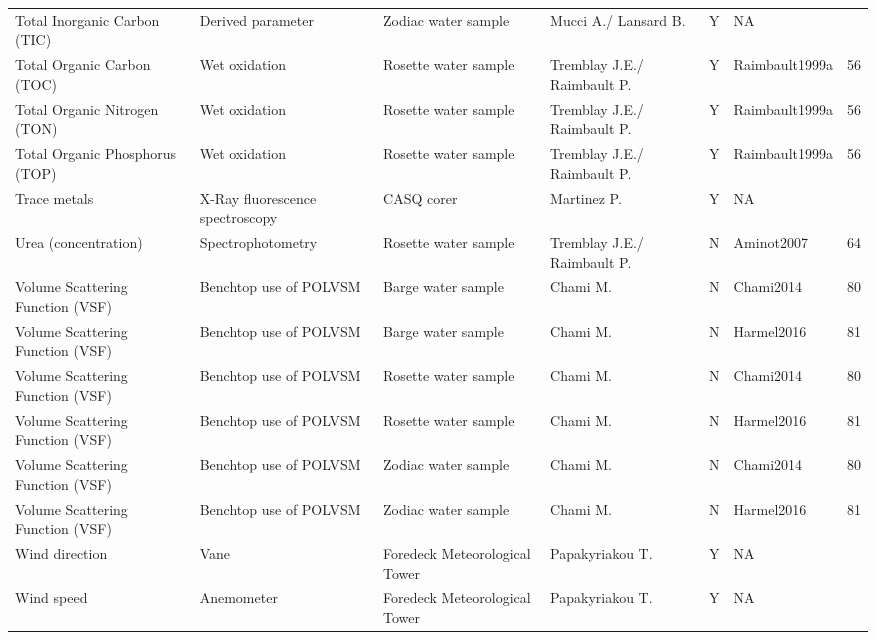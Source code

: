 \begin{ThreePartTable}
\begin{longtable}[t]{lllllll}
Total Inorganic Carbon (TIC) & Derived parameter & Zodiac water sample & Mucci A./ Lansard B. & Y & NA & \\
Total Organic Carbon (TOC) & Wet oxidation & Rosette water sample & Tremblay J.E./ Raimbault P. & Y & Raimbault1999a & 56\\
Total Organic Nitrogen (TON) & Wet oxidation & Rosette water sample & Tremblay J.E./ Raimbault P. & Y & Raimbault1999a & 56\\
\addlinespace
Total Organic Phosphorus (TOP) & Wet oxidation & Rosette water sample & Tremblay J.E./ Raimbault P. & Y & Raimbault1999a & 56\\
Trace metals & X-Ray fluorescence spectroscopy & CASQ corer & Martinez P. & Y & NA & \\
Urea (concentration) & Spectrophotometry & Rosette water sample & Tremblay J.E./ Raimbault P. & N & Aminot2007 & 64\\
Volume Scattering Function (VSF) & Benchtop use of POLVSM & Barge water sample & Chami M. & N & Chami2014 & 80\\
Volume Scattering Function (VSF) & Benchtop use of POLVSM & Barge water sample & Chami M. & N & Harmel2016 & 81\\
\addlinespace
Volume Scattering Function (VSF) & Benchtop use of POLVSM & Rosette water sample & Chami M. & N & Chami2014 & 80\\
Volume Scattering Function (VSF) & Benchtop use of POLVSM & Rosette water sample & Chami M. & N & Harmel2016 & 81\\
Volume Scattering Function (VSF) & Benchtop use of POLVSM & Zodiac water sample & Chami M. & N & Chami2014 & 80\\
Volume Scattering Function (VSF) & Benchtop use of POLVSM & Zodiac water sample & Chami M. & N & Harmel2016 & 81\\
Wind direction & Vane & Foredeck Meteorological Tower & Papakyriakou T. & Y & NA & \\
\addlinespace
Wind speed & Anemometer & Foredeck Meteorological Tower & Papakyriakou T. & Y & NA & \\*
\end{longtable}
\end{ThreePartTable}
\endgroup{}
